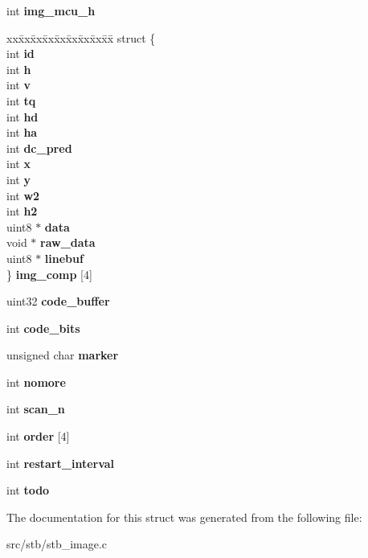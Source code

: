 \begin{DoxyCompactItemize}
int {\bfseries img\+\_\+mcu\+\_\+h}
\item 
\mbox{\label{structjpeg_a1c4874d5cf0e2b80dc0d0b47ddd8be7a}} 
\begin{tabbing}
xx\=xx\=xx\=xx\=xx\=xx\=xx\=xx\=xx\=\kill
struct \{\\
\>int {\bfseries id}\\
\>int {\bfseries h}\\
\>int {\bfseries v}\\
\>int {\bfseries tq}\\
\>int {\bfseries hd}\\
\>int {\bfseries ha}\\
\>int {\bfseries dc\_pred}\\
\>int {\bfseries x}\\
\>int {\bfseries y}\\
\>int {\bfseries w2}\\
\>int {\bfseries h2}\\
\>uint8 $\ast$ {\bfseries data}\\
\>void $\ast$ {\bfseries raw\_data}\\
\>uint8 $\ast$ {\bfseries linebuf}\\
\} {\bfseries img\_comp} \mbox{[}4\mbox{]}\\

\end{tabbing}\item 
\mbox{\label{structjpeg_abfc7f6a333ba3517e669e3e58113bbca}} 
uint32 {\bfseries code\+\_\+buffer}
\item 
\mbox{\label{structjpeg_a6d1b20b5d9d253006fde4e4dd8ab8c04}} 
int {\bfseries code\+\_\+bits}
\item 
\mbox{\label{structjpeg_a9a5cd40790fd432795fb19477c921f8c}} 
unsigned char {\bfseries marker}
\item 
\mbox{\label{structjpeg_a2d114f4d52f50d8d85f43b2a3f161cec}} 
int {\bfseries nomore}
\item 
\mbox{\label{structjpeg_adca2f04da72e50086c77c7070731a679}} 
int {\bfseries scan\+\_\+n}
\item 
\mbox{\label{structjpeg_ac0f5240fc472e75239328f51a50f45b6}} 
int {\bfseries order} \mbox{[}4\mbox{]}
\item 
\mbox{\label{structjpeg_ab13af34259b1f1c6cf8f35411a77e39e}} 
int {\bfseries restart\+\_\+interval}
\item 
\mbox{\label{structjpeg_a6b4a8a352872847d84ea5ef1a4bc245e}} 
int {\bfseries todo}
\end{DoxyCompactItemize}


The documentation for this struct was generated from the following file\+:\begin{DoxyCompactItemize}
\item 
src/stb/stb\+\_\+image.\+c\end{DoxyCompactItemize}
